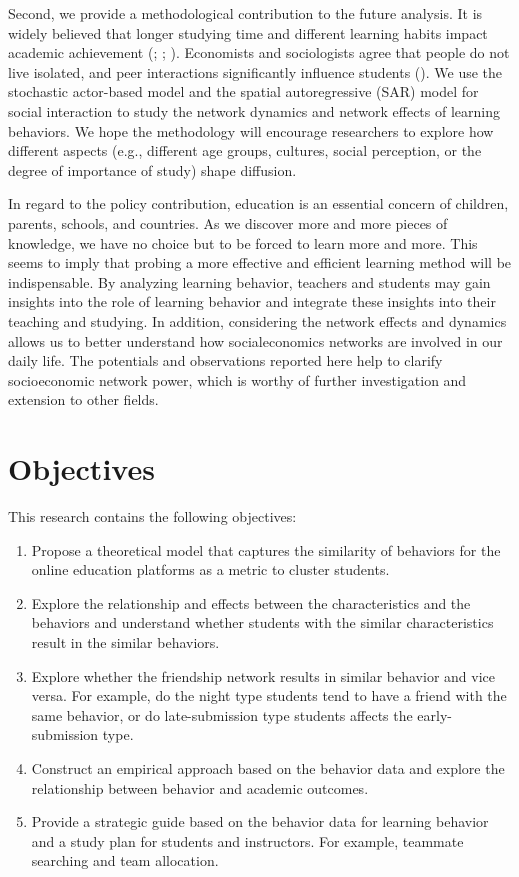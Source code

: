 \documentclass[a4paper]{article}
\theoremstyle{plain}
\begin{document}
Second, we provide a methodological contribution to the future analysis.
It is widely believed that longer studying time and different learning habits
impact academic achievement
(\citet{time}; \citet{time2}; \citet{time3}). Economists and sociologists agree
that people do not live isolated, and peer interactions significantly
influence students (\citet{dynamic}).
We use the stochastic actor-based model and the spatial autoregressive (SAR) model 
for social interaction to study the network dynamics and network effects of
learning behaviors.
We hope the methodology will encourage researchers to explore how different aspects
(e.g., different age groups, cultures, social perception, or the degree of 
importance of study) 
shape diffusion.

In regard to the policy contribution, education is an essential concern of children, parents,
schools, and countries.
As we discover more and more pieces of knowledge, we have no choice but to be forced to
learn more and more. This seems to imply that probing a more effective and efficient
learning method will be indispensable.
By analyzing learning behavior, teachers and students may gain insights
into the role of learning behavior and integrate these insights into their teaching
and studying. In addition, considering the network effects and dynamics
allows us to better understand how socialeconomics networks are involved in our daily life.
The potentials and observations reported here help to clarify socioeconomic network power,
which is worthy of further investigation and extension to other fields.

\newpage

\section*{Objectives}
This research contains the following objectives:
\begin{enumerate}
    \item Propose a theoretical model that captures the similarity of behaviors
        for the online education platforms as a metric to cluster students.
    \item Explore the relationship and effects between the characteristics and the behaviors
        and understand whether students with the similar characteristics result in the similar
        behaviors.
    \item Explore whether the friendship network results in similar behavior and vice versa.
        For example, do the night type students tend to have a friend with the same behavior, or
        do late-submission type students affects the early-submission type.
    \item Construct an empirical approach based on the behavior data and explore the relationship between
        behavior and academic outcomes.
    \item Provide a strategic guide based on the behavior data 
        for learning behavior and a study plan for students and instructors. For example,
        teammate searching and team allocation.
\end{enumerate}
\end{document}
